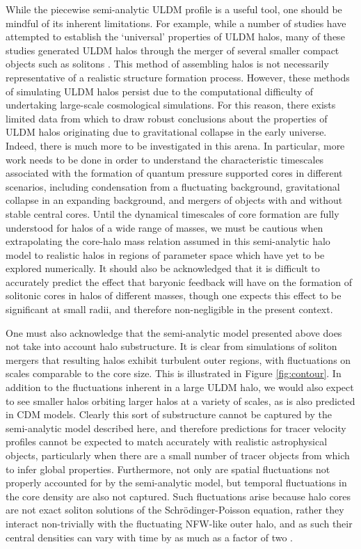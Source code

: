 \documentclass{pasa}%
\begin{document}
While the piecewise semi-analytic ULDM profile is a useful tool, one should be mindful of its inherent limitations. For example, while a number of studies have attempted to establish the `universal' properties of ULDM halos, many of these studies generated ULDM halos through the merger of several smaller compact objects such as solitons \cite{Schwabe:2016rze, Mocz:2017wlg}. This method of assembling halos is not necessarily representative of a realistic structure formation process. However, these methods of simulating ULDM halos persist due to the computational difficulty of undertaking large-scale cosmological simulations. For this reason, there exists limited data from which to draw robust conclusions about the properties of ULDM halos originating due to gravitational collapse in the early universe. 
Indeed, there is much more to be investigated in this arena. In particular, more work needs to be done in order to understand the characteristic timescales associated with the formation of quantum pressure supported cores in different scenarios, including condensation from a fluctuating background, gravitational collapse in an expanding background, and mergers of objects with and without stable central cores. Until the dynamical timescales of core formation are fully understood for halos of a wide range of masses, we must be cautious when extrapolating the core-halo mass relation  assumed in this semi-analytic halo model to realistic halos in regions of parameter space which have yet to be explored numerically. It should also be acknowledged that it is difficult to accurately predict the effect that baryonic feedback will have on the formation of solitonic cores in halos of different masses, though one expects this effect to be significant at small radii, and therefore non-negligible in the present context.

One must also acknowledge that the semi-analytic model presented above does not take into account halo substructure. It is clear from simulations of soliton mergers that resulting halos exhibit turbulent outer regions, with fluctuations on scales comparable to the core size. This is illustrated in Figure \ref{fig:contour}. In addition to the fluctuations inherent in a large ULDM halo, we would also expect to see smaller halos orbiting larger halos at a variety of scales, as is also predicted in CDM models. Clearly this sort of substructure cannot be captured by the semi-analytic model described here, and therefore predictions for tracer velocity profiles cannot be expected to match accurately with realistic astrophysical objects, particularly when there are a small number of tracer objects from which to infer global properties. Furthermore, not only are spatial fluctuations not properly accounted for by the semi-analytic model, but temporal fluctuations in the core density are also not captured. Such fluctuations arise because halo cores are not exact soliton solutions of the Schr\"{o}dinger-Poisson equation, rather they interact non-trivially with the fluctuating NFW-like outer halo, and as such their central densities can vary with time by as much as a factor of two \cite{Veltmaat:2018dfz}.
\end{document}
